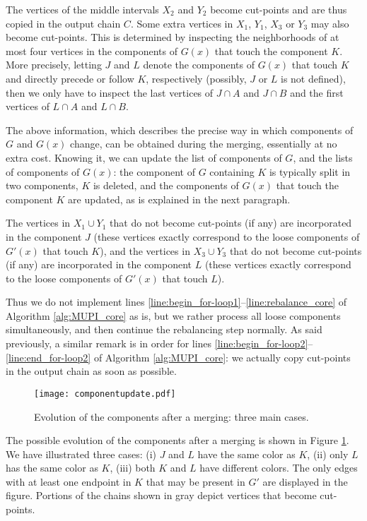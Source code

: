 \documentclass{article} \usepackage{fullpage}
\begin{document}
The vertices of the middle intervals $X_2$ and $Y_2$ become cut-points and are thus copied in the output chain $C$. Some extra vertices in $X_1$, $Y_1$, $X_3$ or $Y_3$ may also become cut-points. This is determined by inspecting the neighborhoods of at most four vertices in the components of $G(x)$ that touch the component $K$. More precisely, letting $J$ and $L$ denote the components of $G(x)$ that touch $K$ and directly precede or follow $K$, respectively (possibly, $J$ or $L$ is not defined), then we only have to inspect the last vertices of $J \cap A$ and $J \cap B$ and the first vertices of $L \cap A$ and $L \cap B$.

The above information, which describes the precise way in which components of $G$ and $G(x)$ change, can be obtained during the merging, essentially at no extra cost. Knowing it, we can update the list of components of $G$, and the lists of components of $G(x)$: the component of $G$ containing $K$ is typically split in two components, $K$ is deleted, and the components of $G(x)$ that touch the component $K$ are updated, as is explained in the next paragraph.
 
The vertices in $X_1 \cup Y_1$ that do not become cut-points (if any) are incorporated in the component $J$ (these vertices exactly correspond to the loose components of $G'(x)$ that touch $K$), and the vertices in $X_3 \cup Y_3$ that do not become cut-points (if any) are incorporated in the component $L$ (these vertices exactly correspond to the loose components of $G'(x)$ that touch $L$). 

Thus we do not implement lines \ref{line:begin_for-loop1}--\ref{line:rebalance_core} of Algorithm \ref{alg:MUPI_core} as is, but we rather process all loose components simultaneously, and then continue the rebalancing step normally. As said previously, a similar remark is in order for lines 
\ref{line:begin_for-loop2}--\ref{line:end_for-loop2} of Algorithm \ref{alg:MUPI_core}: we actually copy cut-points in the output chain as soon as possible.

\begin{figure}[ht]
\begin{center}
\texttt{[image: componentupdate.pdf]}
\end{center}
\caption{Evolution of the components after a merging: three main cases.\label{fig:compupdate}}
\end{figure}

The possible evolution of the components after a merging is shown in Figure \ref{fig:compupdate}. We have illustrated three cases: (i) $J$ and $L$ have the same color as $K$, (ii) only $L$ has the same color as $K$, (iii) both $K$ and $L$ have different colors. The only edges with at least one endpoint in $K$ that may be present in $G'$ are displayed in the figure. Portions of the chains shown in gray depict vertices that become cut-points.
\end{document}
